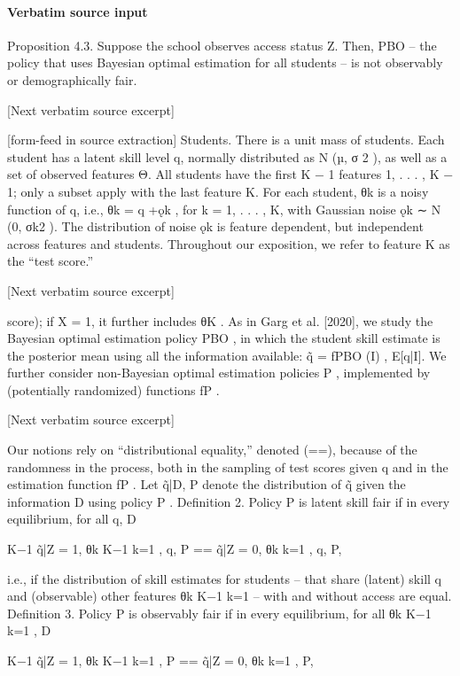 \documentclass[10pt]{article}
\begin{document}
\paragraph{Verbatim source input}
\begin{ReviewVerbatim}
Proposition 4.3. Suppose the school observes access status Z. Then, PBO – the policy that uses
Bayesian optimal estimation for all students – is not observably or demographically fair.

[Next verbatim source excerpt]


[form-feed in source extraction]
Students. There is a unit mass of students. Each student has a latent skill level q, normally
distributed as N (µ, σ 2 ), as well as a set of observed features Θ. All students have the ﬁrst K − 1
features {1, . . . , K − 1}; only a subset apply with the last feature K. For each student, θk is a noisy
function of q, i.e., θk = q +ǫk , for k = 1, . . . , K, with Gaussian noise ǫk ∼ N (0, σk2 ). The distribution
of noise ǫk is feature dependent, but independent across features and students. Throughout our
exposition, we refer to feature K as the “test score.”

[Next verbatim source excerpt]

score); if X = 1, it further includes θK . As in Garg et al. [2020], we study the Bayesian optimal
estimation policy PBO , in which the student skill estimate is the posterior mean using all the
information available:
q̃ = fPBO (I) , E[q|I].
We further consider non-Bayesian optimal estimation policies P , implemented by (potentially
randomized) functions fP .

[Next verbatim source excerpt]

Our notions rely on “distributional equality,” denoted (==), because of the randomness in the
process, both in the sampling of test scores given q and in the estimation function fP . Let q̃|D, P
denote the distribution of q̃ given the information D using policy P .
Definition 2. Policy P is latent skill fair if in every equilibrium, for all q,
D

K−1
q̃|Z = 1, {θk }K−1
k=1 , q, P == q̃|Z = 0, {θk }k=1 , q, P,

i.e., if the distribution of skill estimates for students – that share (latent) skill q and (observable)
other features {θk }K−1
k=1 – with and without access are equal.
Definition 3. Policy P is observably fair if in every equilibrium, for all {θk }K−1
k=1 ,
D

K−1
q̃|Z = 1, {θk }K−1
k=1 , P == q̃|Z = 0, {θk }k=1 , P,


\end{ReviewVerbatim}
\end{document}
